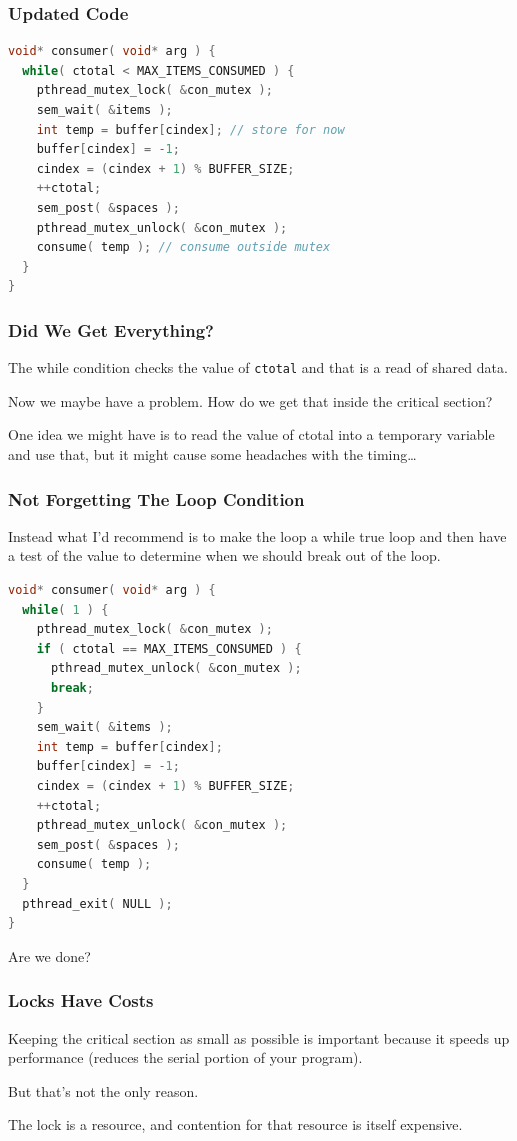 \begin{frame}[fragile]
\frametitle{Updated Code}

\begin{lstlisting}[language=C]
void* consumer( void* arg ) { 
  while( ctotal < MAX_ITEMS_CONSUMED ) {
    pthread_mutex_lock( &con_mutex );
    sem_wait( &items );
    int temp = buffer[cindex]; // store for now
    buffer[cindex] = -1;
    cindex = (cindex + 1) % BUFFER_SIZE;
    ++ctotal;
    sem_post( &spaces );
    pthread_mutex_unlock( &con_mutex );
    consume( temp ); // consume outside mutex
  }
}
\end{lstlisting}


\end{frame}


\begin{frame}
\frametitle{Did We Get Everything?}

The while condition checks the value of \texttt{ctotal} and that is a read of shared data. 

Now we maybe have a problem. How do we get that inside the critical section?

One idea we might have is to read the value of ctotal into a temporary variable and use that, but it might cause some headaches with the timing\ldots


\end{frame}

\begin{frame}[fragile]
\frametitle{Not Forgetting The Loop Condition}

 Instead what I'd recommend is to make the loop a while true loop and then have a test of the value to determine when we should break out of the loop.
 
 \begin{lstlisting}[language=C]
void* consumer( void* arg ) { 
  while( 1 ) { 
    pthread_mutex_lock( &con_mutex );  
    if ( ctotal == MAX_ITEMS_CONSUMED ) {
      pthread_mutex_unlock( &con_mutex );
      break;
    }   
    sem_wait( &items );
    int temp = buffer[cindex];
    buffer[cindex] = -1; 
    cindex = (cindex + 1) % BUFFER_SIZE;
    ++ctotal;
    pthread_mutex_unlock( &con_mutex );
    sem_post( &spaces );
    consume( temp );
  }
  pthread_exit( NULL );
}
\end{lstlisting}

Are we done?

\end{frame}


\begin{frame}
\frametitle{Locks Have Costs}

Keeping the critical section as small as possible is important because it speeds up performance (reduces the serial portion of your program). 

But that's not the only reason. 

The lock is a resource, and contention for that resource is itself expensive.


\end{frame}



